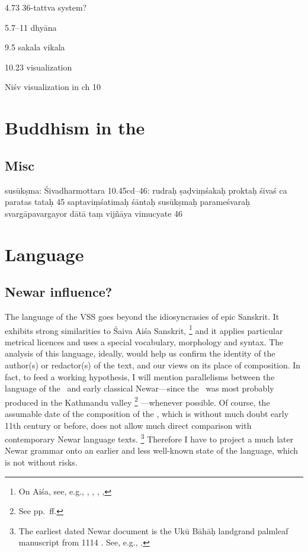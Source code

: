 4.73 36-tattva system?

5.7--11 dhyāna

9.5 sakala vikala

10.23 visualization

Niśv visualization in ch 10




\section{Buddhism in the \VSS}


\subsection{Misc}

  susūkṣma: Śivadharmottara 10.45cd--46: rudraḥ ṣaḍviṃśakaḥ proktaḥ
  śivaś ca paratas tataḥ \textbar{}\textbar{} 45 \textbar{}\textbar{}
  saptaviṃśatimaḥ śāntaḥ susūkṣmaḥ parameśvaraḥ \textbar{}
  svargāpavargayor dātā taṃ vijñāya vimucyate \textbar{}\textbar{} 
  46
  







\section{Language}\label{language}

\subsection{Newar influence?}
\label{newar}

The language of the VSS goes beyond the idiosyncrasies of epic Sanskrit.
It exhibits strong similarities to Śaiva Aiśa Sanskrit,%
		\footnote{On Aiśa, see, e.g., , 
								  ,
						          , 
						          , 
						          } 
and it applies particular metrical licences and 
uses a special vocabulary, morphology and syntax.
The analysis of this language, ideally, would help us
confirm the identity of the author(s) or redactor(s) of the text, 
and our views on its place of composition. In fact, 
to feed a working hypothesis, I will mention parallelisms
between the language of the \VSS\ and early classical 
Newar---since the \VSS\ was most probably produced in the 
Kathmandu valley%
		\footnote{See pp.~\pageref{provenance}\thinspace ff.}%
---whenever possible. 
Of course, the assumable date
of the composition of the \VSS, which is without much doubt
early 11th century or before, does not allow much direct 
comparison with contemporary Newar language texts.%
	\footnote{The earliest dated Newar document is 
			the Ukū Bāhāḥ landgrand palmleaf manuscript from
			1114 \CE. See, e.g., .}
Therefore I have to project a much later Newar grammar
onto an earlier and less well-known 
state of the language, which is not without risks.

